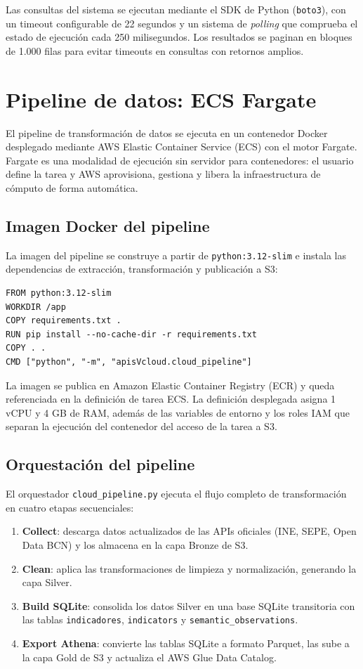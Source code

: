 Las consultas del sistema se ejecutan mediante el SDK de Python (\texttt{boto3}), con un timeout configurable de 22 segundos y un sistema de \textit{polling} que comprueba el estado de ejecución cada 250 milisegundos. Los resultados se paginan en bloques de 1.000 filas para evitar timeouts en consultas con retornos amplios.

\section{Pipeline de datos: ECS Fargate}

El pipeline de transformación de datos se ejecuta en un contenedor Docker desplegado mediante AWS Elastic Container Service (ECS) con el motor Fargate. Fargate es una modalidad de ejecución sin servidor para contenedores: el usuario define la tarea y AWS aprovisiona, gestiona y libera la infraestructura de cómputo de forma automática.

\subsection{Imagen Docker del pipeline}

La imagen del pipeline se construye a partir de \texttt{python:3.12-slim} e instala las dependencias de extracción, transformación y publicación a S3:

\begin{verbatim}
FROM python:3.12-slim
WORKDIR /app
COPY requirements.txt .
RUN pip install --no-cache-dir -r requirements.txt
COPY . .
CMD ["python", "-m", "apisVcloud.cloud_pipeline"]
\end{verbatim}

La imagen se publica en Amazon Elastic Container Registry (ECR) y queda referenciada en la definición de tarea ECS. La definición desplegada asigna 1 vCPU y 4 GB de RAM, además de las variables de entorno y los roles IAM que separan la ejecución del contenedor del acceso de la tarea a S3.

\subsection{Orquestación del pipeline}

El orquestador \texttt{cloud\_pipeline.py} ejecuta el flujo completo de transformación en cuatro etapas secuenciales:

\begin{enumerate}
  \item \textbf{Collect}: descarga datos actualizados de las APIs oficiales (INE, SEPE, Open Data BCN) y los almacena en la capa Bronze de S3.
  \item \textbf{Clean}: aplica las transformaciones de limpieza y normalización, generando la capa Silver.
  \item \textbf{Build SQLite}: consolida los datos Silver en una base SQLite transitoria con las tablas \texttt{indicadores}, \texttt{indicators} y \texttt{semantic\_observations}.
  \item \textbf{Export Athena}: convierte las tablas SQLite a formato Parquet, las sube a la capa Gold de S3 y actualiza el AWS Glue Data Catalog.
\end{enumerate}

